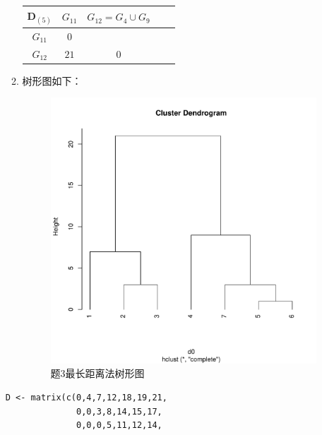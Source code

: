 \begin{enumerate}
\begin{enumerate}[label=(\arabic*)]
\begin{table}[H]
\begin{tabular}{|c|c|c|c|c|}
                \end{tabular}
            \end{table}
            \begin{table}[H]
                \centering
                \begin{tabular}{|c|c|c|c|c|}
                    \hline
                    $\pmb{D}_{(5)}$ & $G_{11}$ & $G_{12}=G_4 \cup G_9$ \\ \hline
                    $G_{11}$ & $0$ & \\ \hline
                    $G_{12}$ & $\textit{21}$ & $0$ \\ \hline
                \end{tabular}
            \end{table}
            \clearpage
            \item 树形图如下：
            \begin{figure}[H]
                \centering
                \includegraphics[scale=0.5]{7.3最长距离法.pdf}
                \caption{题3最长距离法树形图}
            \end{figure}
        \end{enumerate}
        \code
\begin{lstlisting}
D <- matrix(c(0,4,7,12,18,19,21,
              0,0,3,8,14,15,17,
              0,0,0,5,11,12,14,

\end{lstlisting}
\end{enumerate}
